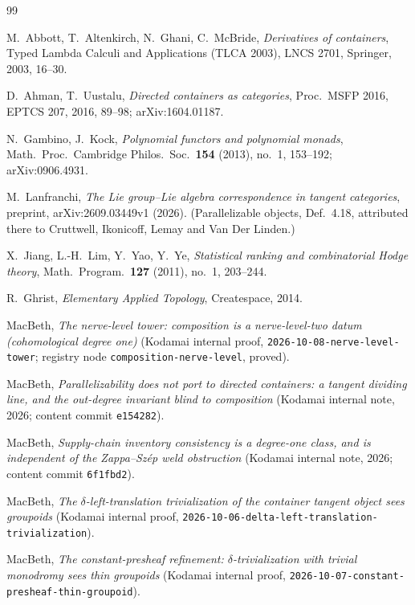 \documentclass[11pt]{article}
\theoremstyle{definition}
\begin{document}
\begin{thebibliography}{99}

M.~Abbott, T.~Altenkirch, N.~Ghani, C.~McBride,
\emph{Derivatives of containers},
Typed Lambda Calculi and Applications (TLCA 2003), LNCS 2701, Springer, 2003, 16--30.

D.~Ahman, T.~Uustalu,
\emph{Directed containers as categories},
Proc.\ MSFP 2016, EPTCS 207, 2016, 89--98; arXiv:1604.01187.

N.~Gambino, J.~Kock,
\emph{Polynomial functors and polynomial monads},
Math.\ Proc.\ Cambridge Philos.\ Soc.\ \textbf{154} (2013), no.~1, 153--192; arXiv:0906.4931.

M.~Lanfranchi,
\emph{The Lie group--Lie algebra correspondence in tangent categories},
preprint, arXiv:2609.03449v1 (2026).
(Parallelizable objects, Def.~4.18, attributed there to
Cruttwell, Ikonicoff, Lemay and Van Der Linden.)

X.~Jiang, L.-H.~Lim, Y.~Yao, Y.~Ye,
\emph{Statistical ranking and combinatorial Hodge theory},
Math.\ Program.\ \textbf{127} (2011), no.~1, 203--244.

R.~Ghrist,
\emph{Elementary Applied Topology},
Createspace, 2014.

MacBeth,
\emph{The nerve-level tower: composition is a nerve-level-two datum (cohomological degree one)}
(Kodamai internal proof, \texttt{2026-10-08-nerve-level-tower}; registry node
\texttt{composition-nerve-level}, proved).

MacBeth,
\emph{Parallelizability does not port to directed containers: a tangent dividing line, and the
out-degree invariant blind to composition}
(Kodamai internal note, 2026; content commit \texttt{e154282}).

MacBeth,
\emph{Supply-chain inventory consistency is a degree-one class, and is independent of the
Zappa--Sz\'ep weld obstruction}
(Kodamai internal note, 2026; content commit \texttt{6f1fbd2}).

MacBeth,
\emph{The $\delta$-left-translation trivialization of the container tangent object sees groupoids}
(Kodamai internal proof, \texttt{2026-10-06-delta-left-translation-trivialization}).

MacBeth,
\emph{The constant-presheaf refinement: $\delta$-trivialization with trivial monodromy sees thin
groupoids}
(Kodamai internal proof, \texttt{2026-10-07-constant-presheaf-thin-groupoid}).


\end{thebibliography}
\end{document}
